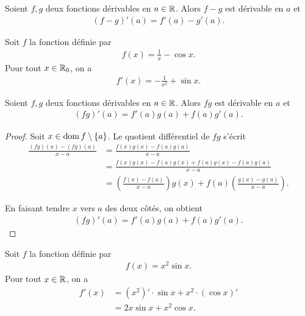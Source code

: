 \documentclass[main.tex]{subfiles}
\begin{document}
\begin{proposition}

    Soient $f, g$ deux fonctions dérivables en $a \in \mathbb{R}$.
    Alors $f - g$ est dérivable en $a$ et
    \begin{align}
        (f - g)'(a) = f'(a) - g'(a).
    \end{align}
\end{proposition}

\begin{example}
    Soit $f$ la fonction définie par 
    \begin{align}
        f(x) = \frac{1}{x} - \cos x.
    \end{align}
    Pour tout $x \in \mathbb{R}_0$, on a 
    \begin{align}
        f'(x) = -\frac{1}{x^2} + \sin x.
    \end{align}
\end{example}

\begin{proposition}

    Soient $f, g$ deux fonctions dérivables en $a \in \mathbb{R}$.
    Alors $f g$ est dérivable en $a$ et
    \begin{align}
        (f g)'(a) = f'(a) g(a) + f(a) g'(a).
    \end{align}
\end{proposition}
\begin{proof}
    Soit $x \in \operatorname{dom} f \setminus \{a\}$.
    Le quotient différentiel de $f g$ s'écrit
    \begin{align}
        \frac {(f g)(x) - (f g)(a)} {x - a}
        &= \frac {f(x) g(x) - f(a) g(a)} {x - a}\\
        &= \frac {f(x) g(x) - f(a) g(x) + f(a) g(x) - f(a) g(a)} {x - a}\\
        &= \left(\frac {f(x) - f(a)} {x - a}\right) g(x) + f(a) \left(\frac {g(x) - g(a)} {x - a}\right).
    \end{align}

    En faisant tendre $x$ vers $a$ des deux côtés,
    on obtient
    \begin{align}
        (f g)'(a) = f'(a) g(a) + f(a) g'(a).
    \end{align}
\end{proof}

\begin{example}
    Soit $f$ la fonction définie par 
    \begin{align}
        f(x) = x^2 \sin x.
    \end{align}
    Pour tout $x \in \mathbb{R}$, on a 
    \begin{align}
        f'(x)
        &= (x^2)' \cdot \sin x + x^2 \cdot (\cos x)'\\
        &=2x \sin x + x^2 \cos x.
    \end{align}
\end{example}
\end{document}
